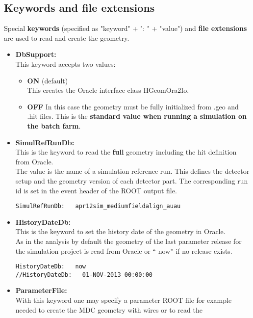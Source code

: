 \subsection{Keywords and file extensions} \label{sec:geomGeainiKeywords}

Special \textbf{keywords} (specified as "keyword" + ": " + "value") and \textbf{file extensions} are used to read and 
create the geometry.
\begin{itemize}
 \item \textbf{DbSupport:}\\
   This keyword accepts two values:
   \begin{itemize}
     \setlength{\itemsep}{0pt}
      \item \textbf{ON} (default)\\
      This creates the Oracle interface class HGeomOra2Io.    
      \item \textbf{OFF}
      In this case the geometry must be fully initialized from .geo and .hit files. This is the \textbf{standard value 
      when running a simulation on the batch farm}.    
    \end{itemize}
 \item \textbf{SimulRefRunDb:}\\
   This is the keyword to read the \textbf{full} geometry including the hit definition from Oracle.\\
   The value is the name of a simulation reference run. This defines the detector setup and the geometry version of each 
   detector part. The corresponding run id is set in the event header of the ROOT output file.
   \begin{lstlisting}
SimulRefRunDb:   apr12sim_mediumfieldalign_auau
   \end{lstlisting}
 \item \textbf{HistoryDateDb:}\\
   This is the keyword to set the history date of the geometry in Oracle.\\
   As in the analysis by default the geometry of the last parameter release for the simulation project is read from Oracle or 
   `` now'' if no release exists.
   \begin{lstlisting}
HistoryDateDb:   now
//HistoryDateDb:   01-NOV-2013 00:00:00
   \end{lstlisting}
 \item \textbf{ParameterFile:}\\
   With this keyword one may specify a parameter ROOT file for example needed to create the MDC geometry with wires or to read the 

\end{itemize}
